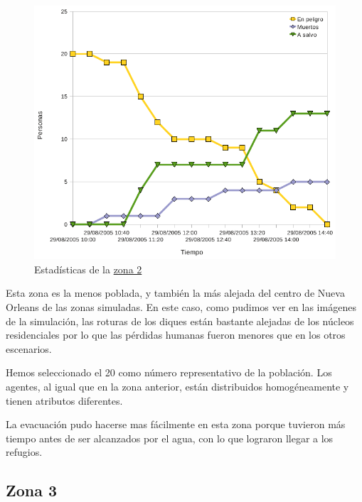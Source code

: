 \begin{figure}[H]
 \centering
 \includegraphics[width=135mm]{figuras/cap6/stats/Zona2.png}
 \caption{Estadísticas de la \hyperref[zona2]{zona 2}}
\end{figure}

Esta zona es la menos poblada, y también la más alejada del centro de Nueva
Orleans de las zonas simuladas. En este caso, como pudimos ver en las imágenes
de la simulación, las roturas de los  diques están bastante alejadas de los
núcleos residenciales por lo que las pérdidas humanas fueron menores que en los
otros escenarios.

Hemos seleccionado el 20 como número representativo de la población. Los
agentes, al igual que en la zona anterior, están distribuidos homogéneamente y
tienen atributos diferentes.

La evacuación pudo hacerse mas fácilmente en esta zona porque tuvieron más
tiempo antes de ser alcanzados por el agua, con lo que lograron llegar a los
refugios.

\subsection{Zona 3}

